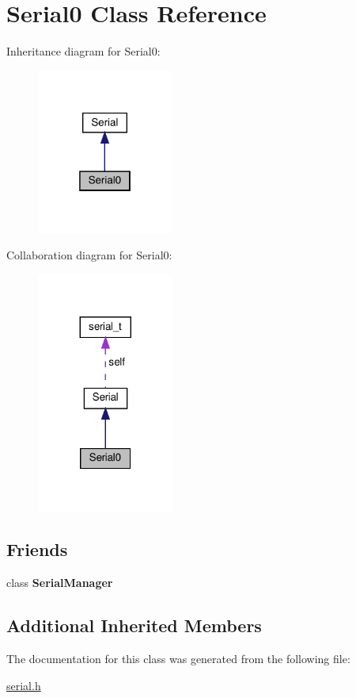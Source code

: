 \hypertarget{classSerial0}{}\section{Serial0 Class Reference}
\label{classSerial0}


Inheritance diagram for Serial0\+:\nopagebreak
\begin{figure}[H]
\begin{center}
\leavevmode
\includegraphics[width=127pt]{classSerial0__inherit__graph}
\end{center}
\end{figure}


Collaboration diagram for Serial0\+:\nopagebreak
\begin{figure}[H]
\begin{center}
\leavevmode
\includegraphics[width=128pt]{classSerial0__coll__graph}
\end{center}
\end{figure}
\subsection*{Friends}
\begin{DoxyCompactItemize}
\item 
\mbox{\label{classSerial0_ae711712f6bc003a5d1156a409a19941b}} 
class {\bfseries Serial\+Manager}
\end{DoxyCompactItemize}
\subsection*{Additional Inherited Members}


The documentation for this class was generated from the following file\+:\begin{DoxyCompactItemize}
\item 
\hyperlink{serial_8h}{serial.\+h}\end{DoxyCompactItemize}
